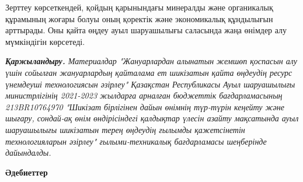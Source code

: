 \begin{multicols}{2}
Зерттеу көрсеткендей, қойдың қарынындағы минералды және органикалық
құрамының жоғары болуы оның қоректік және экономикалық құндылығын
арттырады. Оны қайта өңдеу ауыл шаруашылығы саласында жаңа өнімдер алу
мүмкіндігін көрсетеді.

\emph{{\bfseries Қаржыландыру.} Материалдар "Жануарлардан алынатын жемшөп
қоспасын алу үшін сойылған жануарлардың қайталама ет шикізатын қайта
өңдеудің ресурс үнемдеуші технологиясын әзірлеу" Қазақстан Республикасы
Ауыл шаруашылығы министрлігінің 2021-2023 жылдарға арналған бюджеттік
бағдарламасының 213BR10764970 "Шикізат бірлігінен дайын өнімнің
түр-түрін кеңейту және шығару, сондай-ақ өнім өндірісіндегі қалдықтар
үлесін азайту мақсатында ауыл шаруашылығы шикізатын терең өңдеудің
ғылымды қажетсінетін технологияларын әзірлеу" ғылыми-техникалық
бағдарламасы шеңберінде дайындалды.}
\end{multicols}

\begin{center}
{\bfseries Әдебиеттер}
\end{center}

